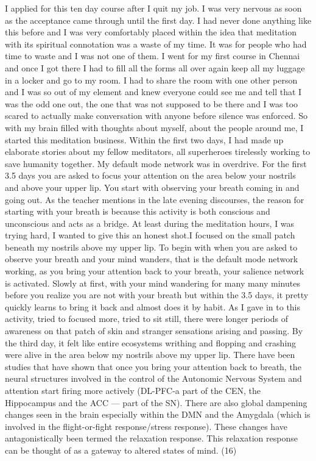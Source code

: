 \documentclass[twocolumn]{article}
\begin{document}
I applied for this ten day course after I quit my job. I was very nervous as soon as the acceptance came through until the first day. I had never done anything like this before and I was very comfortably placed within the idea that meditation with its spiritual connotation was a waste of my time. It was for people who had time to waste and I was not one of them. I went for my first course in Chennai and once I got there I had to fill all the forms all over again keep all my luggage in a locker and go to my room. I had to share the room with one other person and I was so out of my element and knew everyone could see me and tell that I was the odd one out, the one that was not supposed to be there and I was too scared to actually make conversation with anyone before silence was enforced. So with my brain filled with thoughts about myself, about the people around me, I started this meditation business. Within the first two days, I had made up elaborate stories about my fellow meditators, all superheroes tirelessly working to save humanity together. My default mode network was in overdrive.
For the first 3.5 days you are asked to focus your attention on the area below your nostrils and above your upper lip. You start with observing your breath coming in and going out. As the teacher mentions in the late evening discourses, the reason for starting with your breath is because this activity is both conscious and unconscious and acts as a bridge.
At least during the meditation hours, I was trying hard, I wanted to give this an honest shot.I focused on the small patch beneath my nostrils above my upper lip. To begin with when you are asked to observe your breath and your mind wanders, that is the default mode network working, as you bring your attention back to your breath, your salience network is activated. Slowly at first, with your mind wandering for many many minutes before you realize you are not with your breath but within the 3.5 days, it pretty quickly learns to bring it back and almost does it by habit. As I gave in to this activity, tried to focused more, tried to sit still, there were longer periods of awareness on that patch of skin and stranger sensations arising and passing. By the third day, it felt like entire ecosystems writhing and flopping and crashing were alive in the area below my nostrils above my upper lip. There have been studies that have shown that once you bring your attention back to breath, the neural structures involved in the control of the Autonomic Nervous System and attention start firing more actively (DL-PFC-a part of the CEN, the Hippocampus and the ACC — part of the SN). There are also global dampening changes seen in the brain especially within the DMN and the Amygdala (which is involved in the flight-or-fight response/stress response). These changes have antagonistically been termed the relaxation response. This relaxation response can be thought of as a gateway to altered states of mind. (16)
\end{document}
